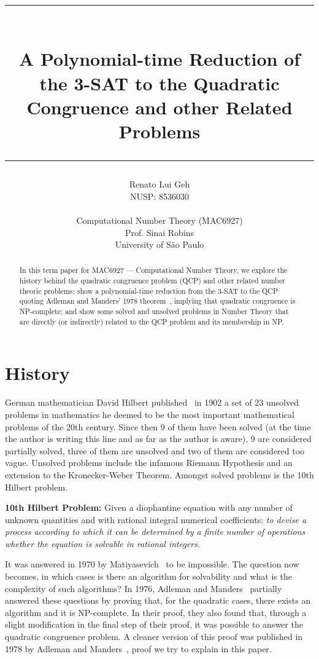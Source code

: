 \documentclass{amsart}
\title{%
  \noindent\rule{13cm}{1.0pt}\\
  \vspace{0.2cm}
  A Polynomial-time Reduction of the 3-SAT to the Quadratic Congruence and other Related Problems
  \noindent\rule{13cm}{0.8pt}
}
\author[]{\normalsize Renato Lui Geh\\\small NUSP\@: 8536030\\\\Computational Number Theory
(MAC6927)\\Prof\@. Sinai Robins\\University of São Paulo\\}
\theoremstyle{plain}
\begin{document}
\begin{abstract}
  In this term paper for MAC6927 --- Computational Number Theory, we explore the history behind the
  quadratic congruence problem (QCP) and other related number theoric problems; show a
  polynomial-time reduction from the 3-SAT to the QCP quoting Adleman and Manders' 1978
  theorem~\cite{qcp2}, implying that quadratic congruence is NP-complete; and show some solved and
  unsolved problems in Number Theory that are directly (or indirectly) related to the QCP problem
  and its membership in NP\@.
  \vspace*{-3.5em}
\end{abstract}

\maketitle

\section{History}

German mathematician David Hilbert published~\cite{hilbert} in 1902 a set of 23 unsolved problems
in mathematics he deemed to be the most important mathematical problems of the 20th century.  Since
then 9 of them have been solved (at the time the author is writing this line and as far as the
author is aware), 9 are considered partially solved, three of them are unsolved and two of them are
considered too vague. Unsolved problems include the infamous Riemann Hypothesis and an extension to
the Kronecker-Weber Theorem. Amongst solved problems is the 10th Hilbert problem.

\textbf{10th Hilbert Problem:} Given a diophantine equation with any number of unknown quantities
and with rational integral numerical coefficients: \textit{to devise a process according to which
it can be determined by a finite number of operations whether the equation is solvable in rational
integers}.

It was answered in 1970 by Matiyasevich~\cite{diophantine} to be impossible. The question now
becomes, in which cases is there an algorithm for solvability and what is the complexity of such
algorithms? In 1976, Adleman and Manders~\cite{qcp1} partially answered these questions by proving
that, for the quadratic cases, there exists an algorithm and it is NP-complete. In their proof,
they also found that, through a slight modification in the final step of their proof, it was
possible to answer the quadratic congruence problem. A cleaner version of this proof was published
in 1978 by Adleman and Manders~\cite{qcp2}, proof we try to explain in this paper.
\end{document}

